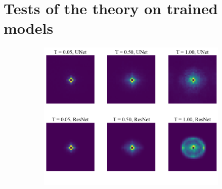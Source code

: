 \documentclass{article}
\theoremstyle{plain}
\theoremstyle{definition}
\theoremstyle{remark}
\begin{document}
\section{Tests of the theory on trained models}
\label{sec:theoryexp}

\begin{figure}
    \centering
    \begin{subfigure}[b]{0.39\linewidth}
    \includegraphics[width=\linewidth,valign=b]{sjf_1.png}
    \label{fig:scales_jacobiana}
    \vspace{-1em}
    \caption{}
    \end{subfigure}\hspace{10mm} 
    \begin{subfigure}[b]{0.17\linewidth}

\end{subfigure}
\end{figure}
\end{document}
